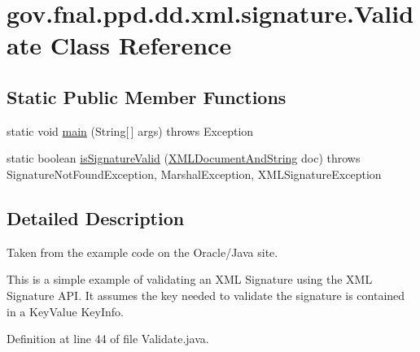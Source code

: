 \hypertarget{classgov_1_1fnal_1_1ppd_1_1dd_1_1xml_1_1signature_1_1Validate}{\section{gov.\-fnal.\-ppd.\-dd.\-xml.\-signature.\-Validate Class Reference}
\label{classgov_1_1fnal_1_1ppd_1_1dd_1_1xml_1_1signature_1_1Validate}
}
\subsection*{Static Public Member Functions}
\begin{DoxyCompactItemize}
\item 
static void \hyperlink{classgov_1_1fnal_1_1ppd_1_1dd_1_1xml_1_1signature_1_1Validate_abaf672a64ab32096e2f296b2543e13ab}{main} (String\mbox{[}$\,$\mbox{]} args)  throws Exception 
\item 
static boolean \hyperlink{classgov_1_1fnal_1_1ppd_1_1dd_1_1xml_1_1signature_1_1Validate_a9d0a0a1029bc2eeed35a10beb6ab3667}{is\-Signature\-Valid} (\hyperlink{classgov_1_1fnal_1_1ppd_1_1dd_1_1xml_1_1XMLDocumentAndString}{X\-M\-L\-Document\-And\-String} doc)  throws Signature\-Not\-Found\-Exception, Marshal\-Exception, X\-M\-L\-Signature\-Exception 
\end{DoxyCompactItemize}


\subsection{Detailed Description}
Taken from the example code on the Oracle/\-Java site.

This is a simple example of validating an X\-M\-L Signature using the X\-M\-L Signature A\-P\-I. It assumes the key needed to validate the signature is contained in a Key\-Value Key\-Info. 

Definition at line 44 of file Validate.\-java.



